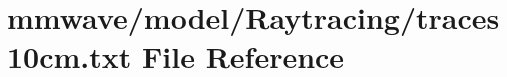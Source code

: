 \hypertarget{traces10cm_8txt}{}\section{mmwave/model/\+Raytracing/traces10cm.txt File Reference}
\label{traces10cm_8txt}

